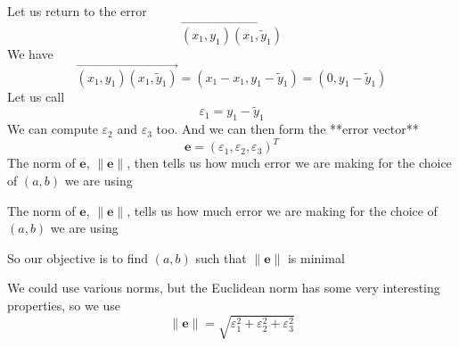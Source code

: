 \documentclass[aspectratio=169]{beamer}\usepackage[]{graphicx}\usepackage[]{xcolor}
\makeatletter
\newcommand{\hlnum}[1]{\textcolor[rgb]{0.686,0.059,0.569}{#1}}%
\newcommand{\hlstr}[1]{\textcolor[rgb]{0.192,0.494,0.8}{#1}}%
\newcommand{\hlcom}[1]{\textcolor[rgb]{0.678,0.584,0.686}{\textit{#1}}}%
\newcommand{\hlopt}[1]{\textcolor[rgb]{0,0,0}{#1}}%
\newcommand{\hlstd}[1]{\textcolor[rgb]{0.345,0.345,0.345}{#1}}%
\newcommand{\hlkwb}[1]{\textcolor[rgb]{0.69,0.353,0.396}{#1}}%
\newcommand{\hlkwc}[1]{\textcolor[rgb]{0.333,0.667,0.333}{#1}}%
\newcommand{\hlkwd}[1]{\textcolor[rgb]{0.737,0.353,0.396}{\textbf{#1}}}%
\newenvironment{kframe}{%
 \def\at@end@of@kframe{}%
 \ifinner\ifhmode%
  \def\at@end@of@kframe{\end{minipage}}%
  \begin{minipage}{\columnwidth}%
 \fi\fi%
 \def\FrameCommand##1{\hskip\@totalleftmargin \hskip-\fboxsep
 \colorbox{shadecolor}{##1}\hskip-\fboxsep
     \hskip-\linewidth \hskip-\@totalleftmargin \hskip\columnwidth}%
 \MakeFramed {\advance\hsize-\width
   \@totalleftmargin\z@ \linewidth\hsize
   \@setminipage}}%
 {\par\unskip\endMakeFramed%
 \at@end@of@kframe}
\newenvironment{knitrout}{}{} %
\makeatother
\begin{document}

\begin{frame}
Let us return to the error
$$
\overrightarrow{(x_1,y_1)(x_1,\tilde y_1)}
$$
We have
$$
\overrightarrow{(x_1,y_1)(x_1,\tilde y_1)}
= (x_1-x_1,y_1-\tilde y_1)
= (0, y_1-\tilde y_1)
$$
Let us call
$$
\varepsilon_1 = y_1-\tilde y_1
$$
We can compute $\varepsilon_2$ and $\varepsilon_3$ too. And we can then form the **error vector**
$$
\mathbf{e} = (\varepsilon_1,\varepsilon_2,\varepsilon_3)^T
$$
The norm of $\mathbf{e}$, $\|\mathbf{e}\|$, then tells us how much error we are making for the choice of $(a,b)$ we are using
\end{frame}


\begin{frame}
The norm of $\mathbf{e}$, $\|\mathbf{e}\|$, tells us how much error we are making for the choice of $(a,b)$ we are using

So our objective is to find $(a,b)$ such that $\|\mathbf{e}\|$ is minimal

We could use various norms, but the Euclidean norm has some very interesting properties, so we use
$$
\|\mathbf{e}\| = \sqrt{\varepsilon_1^2+\varepsilon_2^2+\varepsilon_3^2}
$$
\end{frame}
\end{document}
